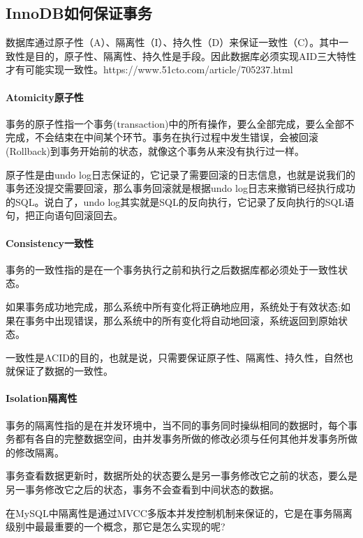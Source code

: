 \documentclass[../../../interview-questions.tex]{subfiles}
\begin{document}
\subsection{InnoDB如何保证事务}

数据库通过原子性（A）、隔离性（I）、持久性（D）来保证一致性（C）。其中一致性是目的，原子性、隔离性、持久性是手段。因此数据库必须实现AID三大特性才有可能实现一致性。https://www.51cto.com/article/705237.html

\paragraph{Atomicity原子性}

事务的原子性指一个事务(transaction)中的所有操作，要么全部完成，要么全部不完成，不会结束在中间某个环节。事务在执行过程中发生错误，会被回滚(Rollback)到事务开始前的状态，就像这个事务从来没有执行过一样。

原子性是由undo log日志保证的，它记录了需要回滚的日志信息，也就是说我们的事务还没提交需要回滚，那么事务回滚就是根据undo log日志来撤销已经执行成功的SQL。说白了，undo log其实就是SQL的反向执行，它记录了反向执行的SQL语句，把正向语句回滚回去。

\paragraph{Consistency一致性}

事务的一致性指的是在一个事务执行之前和执行之后数据库都必须处于一致性状态。

如果事务成功地完成，那么系统中所有变化将正确地应用，系统处于有效状态;如果在事务中出现错误，那么系统中的所有变化将自动地回滚，系统返回到原始状态。

一致性是ACID的目的，也就是说，只需要保证原子性、隔离性、持久性，自然也就保证了数据的一致性。

\paragraph{Isolation隔离性}

事务的隔离性指的是在并发环境中，当不同的事务同时操纵相同的数据时，每个事务都有各自的完整数据空间，由并发事务所做的修改必须与任何其他并发事务所做的修改隔离。

事务查看数据更新时，数据所处的状态要么是另一事务修改它之前的状态，要么是另一事务修改它之后的状态，事务不会查看到中间状态的数据。

在MySQL中隔离性是通过MVCC多版本并发控制机制来保证的，它是在事务隔离级别中最最重要的一个概念，那它是怎么实现的呢?
\end{document}
